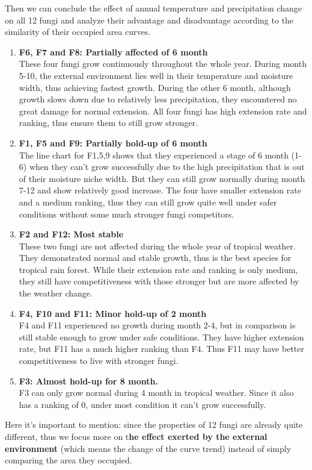 \documentclass[a4paper,12pt]{article}
\begin{document}
Then we can conclude the effect of annual temperature and precipitation change on all 12 fungi and analyze their advantage and disadvantage according to the similarity of their occupied area curves.
\begin{enumerate}
\setlength{\itemsep}{0ex} %
\item \textbf{F6, F7 and F8:  Partially affected of 6 month}\\
These four fungi grow continuously throughout the whole year. During month 5-10, the external environment lies well in their temperature and moisture width, thus achieving fastest growth. During the other 6 month, although growth slows down due to relatively less precipitation, they encountered no great damage for normal extension. All four fungi has high extension rate and ranking, thus ensure them to still grow stronger.
\item \textbf{F1, F5 and F9:  Partially hold-up of 6 month}\\
The line chart for F1,5,9 shows that they experienced a stage of 6 month (1-6) when they can't grow successfully due to the high precipitation that is out of their moisture niche width. But they can still grow normally during month 7-12 and show relatively good increase. The four have smaller extension rate and a medium ranking, thus they can still grow quite well under safer conditions without some much stronger fungi competitors.
\item \textbf{F2 and F12: Most stable} \\
These two fungi are not affected during the whole year of tropical weather. They demonstrated normal and stable growth, thus is the best species for tropical rain forest. While their extension rate and ranking is only medium, they still have competitiveness with those stronger but are more affected by the weather change.
\item  \textbf{F4, F10 and F11: Minor hold-up of 2 month} \\
F4 and F11 experienced no growth during month 2-4, but in comparison is still stable enough to grow under safe conditions. They have higher extension rate, but F11 has a much higher ranking than F4. Thus F11 may have better competitiveness to live with stronger fungi.
\item \textbf{F3: Almost hold-up for 8 month.} \\
F3 can only grow normal during 4 month in tropical weather. Since it also has a ranking of 0, under most condition it can't grow successfully.
\end{enumerate}
Here it's important to mention: since the properties of 12 fungi are already quite different, thus we focus more on t\textbf{he effect exerted by the external environment} (which means the change of the curve trend) instead of simply comparing the area they occupied.
\end{document}
